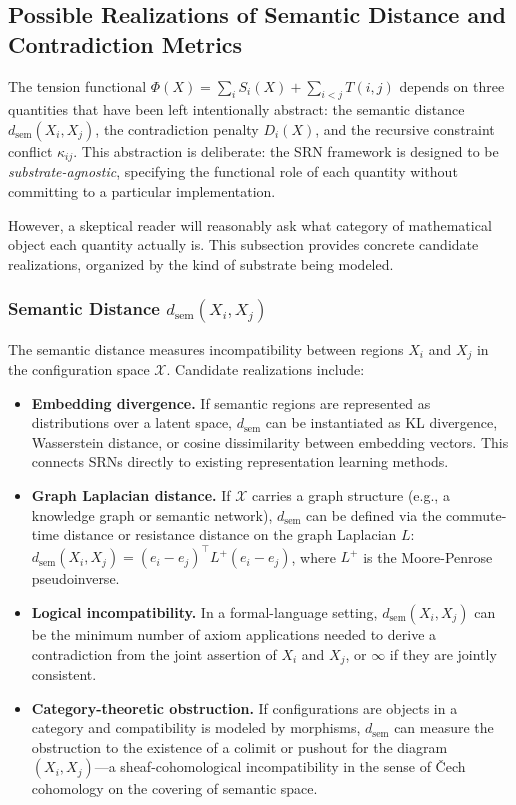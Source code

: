 \documentclass[11pt, a4paper]{article}
\theoremstyle{srn}
\theoremstyle{srnremark}
\newcommand{\Phiten}{\varPhi}            %
\newcommand{\dsem}{d_{\mathrm{sem}}}  %
\begin{document}
\subsection{Possible Realizations of Semantic Distance and Contradiction Metrics}

The tension functional $\Phiten(X) = \sum_i S_i(X) + \sum_{i<j} T(i,j)$
depends on three quantities that have been left intentionally abstract:
the semantic distance $\dsem(X_i, X_j)$, the contradiction penalty
$D_i(X)$, and the recursive constraint conflict $\kappa_{ij}$.
This abstraction is deliberate: the SRN framework is designed to be
\emph{substrate-agnostic}, specifying the functional role of each
quantity without committing to a particular implementation.

However, a skeptical reader will reasonably ask what category of
mathematical object each quantity actually is.
This subsection provides concrete candidate realizations, organized
by the kind of substrate being modeled.

\subsubsection*{Semantic Distance $\dsem(X_i, X_j)$}

The semantic distance measures incompatibility between regions $X_i$
and $X_j$ in the configuration space $\mathcal{X}$.
Candidate realizations include:

\begin{itemize}
  \item \textbf{Embedding divergence.}
    If semantic regions are represented as distributions over a latent
    space, $\dsem$ can be instantiated as KL divergence, Wasserstein
    distance, or cosine dissimilarity between embedding vectors.
    This connects SRNs directly to existing representation learning
    methods.

  \item \textbf{Graph Laplacian distance.}
    If $\mathcal{X}$ carries a graph structure (e.g., a knowledge graph
    or semantic network), $\dsem$ can be defined via the commute-time
    distance or resistance distance on the graph Laplacian $L$:
    $\dsem(X_i, X_j) = (e_i - e_j)^\top L^+ (e_i - e_j)$, where
    $L^+$ is the Moore-Penrose pseudoinverse.

  \item \textbf{Logical incompatibility.}
    In a formal-language setting, $\dsem(X_i, X_j)$ can be the
    minimum number of axiom applications needed to derive a
    contradiction from the joint assertion of $X_i$ and $X_j$, or
    $\infty$ if they are jointly consistent.

  \item \textbf{Category-theoretic obstruction.}
    If configurations are objects in a category and compatibility is
    modeled by morphisms, $\dsem$ can measure the obstruction to the
    existence of a colimit or pushout for the diagram $(X_i, X_j)$---a
    sheaf-cohomological incompatibility in the sense of
    \v{C}ech cohomology on the covering of semantic space.
\end{itemize}
\end{document}

